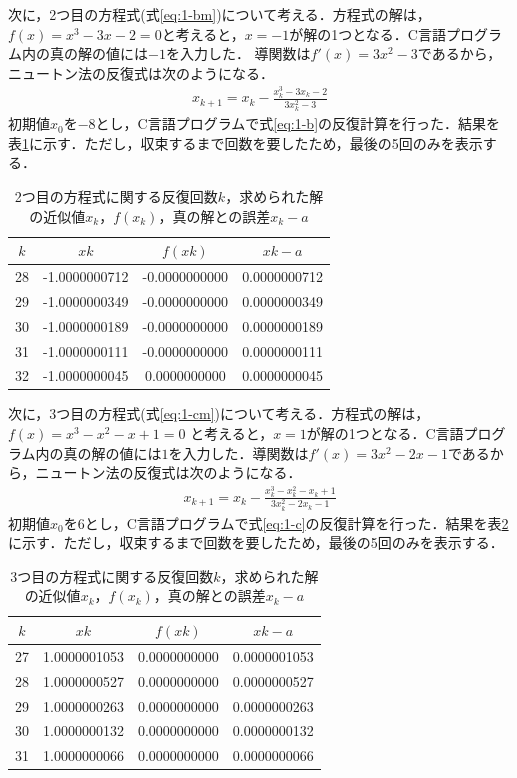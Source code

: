 \documentclass[12pt]{jarticle}
\renewcommand  \[  {\begin{eqnarray}}
\renewcommand  \]  {\end{eqnarray}}
\begin{document}
次に，2つ目の方程式(式\ref{eq:1-bm})について考える．方程式の解は，$f(x)=x^3-3x-2=0$と考えると，$x=-1$が解の1つとなる．C言語プログラム内の真の解の値には$-1$を入力した．
導関数は$f\prime(x)=3x^2-3$であるから，ニュートン法の反復式は次のようになる．
\[
\label{eq:1-b}
x_{k+1}=x_k- \frac{x_k^3-3x_k-2}{3x_k^2-3}
\]
初期値$x_0$を$-8$とし，C言語プログラムで式\ref{eq:1-b}の反復計算を行った．結果を表\ref{tab:1-b}に示す．ただし，収束するまで回数を要したため，最後の5回のみを表示する．
\begin{table}[t]
 \caption{2つ目の方程式に関する反復回数$k$，求められた解の近似値$x_k$，$f(x_k)$，真の解との誤差\textbar $x_k-a$\textbar}
 \label{tab:1-b}
 \center
\begin{tabular}{|c|c|c|c|}
\hline
$k$ & $xk$ & $f(xk)$ & $xk-a$\\
\hline
28  & -1.0000000712 & -0.0000000000 & 0.0000000712\\
29  & -1.0000000349 & -0.0000000000 & 0.0000000349\\
30  & -1.0000000189 & -0.0000000000 & 0.0000000189\\
31  & -1.0000000111 & -0.0000000000 & 0.0000000111\\
32  & -1.0000000045 & 0.0000000000 & 0.0000000045\\
\hline
 \end{tabular}
\end{table}


次に，3つ目の方程式(式\ref{eq:1-cm})について考える．方程式の解は，$f(x)=x^3-x^2-x+1=0$
と考えると，$x=1$が解の1つとなる．C言語プログラム内の真の解の値には$1$を入力した．導関数は$f\prime(x)=3x^2-2x-1$であるから，ニュートン法の反復式は次のようになる．
\[
\label{eq:1-c}
x_{k+1}=x_k- \frac{x_k^3-x_k^2-x_k+1}{3x_k^2-2x_k-1}
\]
初期値$x_0$を$6$とし，C言語プログラムで式\ref{eq:1-c}の反復計算を行った．結果を表\ref{tab:1-c}に示す．ただし，収束するまで回数を要したため，最後の5回のみを表示する．
\begin{table}[t]
 \caption{3つ目の方程式に関する反復回数$k$，求められた解の近似値$x_k$，$f(x_k)$，真の解との誤差\textbar $x_k-a$\textbar}
 \label{tab:1-c}
 \center
\begin{tabular}{|c|c|c|c|}
\hline
$k$ & $xk$ & $f(xk)$ & $xk-a$ \\
\hline
27  & 1.0000001053 & 0.0000000000 & 0.0000001053\\
28  & 1.0000000527 & 0.0000000000 & 0.0000000527\\
29  & 1.0000000263 & 0.0000000000 & 0.0000000263\\
30  & 1.0000000132 & 0.0000000000 & 0.0000000132\\
31  & 1.0000000066 & 0.0000000000 & 0.0000000066\\
\hline
 \end{tabular}
\end{table}
\end{document}
